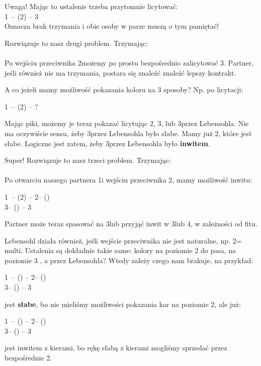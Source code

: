 \documentclass[12pt, a4paper]{article}
\begin{document}
Uwaga! Mając to ustalenie trzeba przytomnie licytować:\\
1\nt\ -- (2\spades) -- 3\nt\\
Oznacza brak trzymania i obie osoby w parze muszą o tym pamiętać!

Rozwiązuje to nasz drugi problem. Trzymając:\\
\\
Po wejściu przeciwnika 2\spades możemy po prostu bezpośrednio zalicytować 3\nt. 
Partner, jeśli również nie ma trzymania, postara się znaleźć znaleźć lepszy kontrakt.

A co jeżeli mamy możliwość pokazania koloru na 3 sposoby? Np. po licytacji:

1\nt\ -- (2\hearts) -- ?

Mając piki, możemy je teraz pokazać licytując 2\spades, 3\spades, lub 3\spades przez Lebensohla.
Nie ma oczywiście sensu, żeby 3\spades przez Lebensohla było słabe. Mamy już 2\spades, które 
jest słabe. Logiczne jest zatem, żeby 3\spades przez Lebensohla było \textbf{inwitem}. 

Super! Rozwiązuje to nasz trzeci problem. Trzymając:\\
\\
Po otwarciu naszego partnera 1\nt i wejściu przeciwnika 2\hearts, mamy możliwość inwitu:

1\nt\ -- (2\hearts) -- 2\nt -- (\pass)\\
3\clubs -- (\pass) -- 3\spades

Partner może teraz spasować na 3\spades lub przyjąć inwit w 3\nt lub 4\spades, w zależności
od fitu.

Lebensohl działa również, jeśli wejście przeciwnika nie jest naturalne, np. 2\diams = multi.
Ustalenia są dokładnie takie same: kolory na poziomie 2 do pasa, na poziomie 3 \gf,
a przez Lebensohla? Wtedy zależy czego nam brakuje, na przykład:

1\nt\ -- (\alrts{2\diams}) -- 2\nt -- (\pass)\\
3\clubs -- (\pass) -- 3\diams

jest \textbf{słabe}, bo nie mieliśmy możliwości pokazania kar na poziomie 2, ale już:

1\nt\ -- (\alrts{2\diams}) -- 2\nt -- (\pass)\\
3\clubs -- (\pass) -- 3\hearts

jest inwitem z kierami, bo rękę słabą z kierami mogliśmy sprzedać przez bezpośrednie 2\hearts.
\end{document}
